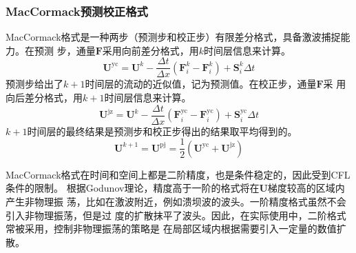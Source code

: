 \subsubsection{MacCormack预测校正格式}
MacCormack格式是一种两步（预测步和校正步）有限差分格式，具备激波捕捉能力。在预测
步，通量$\mathbf{F}$采用向前差分格式，用$k$时间层信息来计算。
\begin{equation}
  \mathbf{U}^{\mathrm{yc}} =
  \mathbf{U}^{k} -
  \frac{\Delta t }{\Delta x }
  (\mathbf{F}_{i}^{k} - \mathbf{F}_{i}^{k}) +
  \mathbf{S}_{i}^{k}\Delta t
\end{equation}
预测步给出了$k+1$时间层的流动的近似值，记为预测值。在校正步，通量$\mathbf{F}$采
用向后差分格式，用$k+1$时间层信息来计算。
\begin{equation}
  \mathbf{U}^{\mathrm{jz}} =
  \mathbf{U}^{k} -
  \frac{\Delta t }{\Delta x }
  (\mathbf{F}_{i}^{\mathrm{yc}} - \mathbf{F}_{i}^{\mathrm{yc}}) +
  \mathbf{S}_{i}^{\mathrm{yc}}\Delta t
\end{equation}
$k+1$时间层的最终结果是预测步和校正步得出的结果取平均得到的。
\begin{equation}
  \mathbf{U}^{k+1} =
  \mathbf{U}^{\mathrm{pj}} =
  \frac{1}{2}
  (\mathbf{U}^{\mathrm{yc}} +\mathbf{U}^{\mathrm{jz}})
\end{equation}

MacCormack格式在时间和空间上都是二阶精度，也是条件稳定的，因此受到CFL条件的限制。
根据Godunov理论，精度高于一阶的格式将在$\mathbf{U}$梯度较高的区域内产生非物理振
荡，比如在激波附近，例如溃坝波的波头。一阶精度格式虽然不会引入非物理振荡，但是过
度的扩散抹平了波头。因此，在实际使用中，二阶格式常被采用，控制非物理振荡的策略是
在局部区域内根据需要引入一定量的数值扩散。


